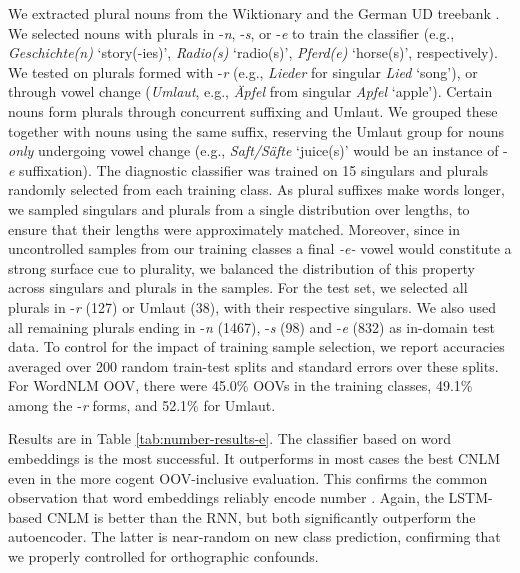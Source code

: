 We extracted plural nouns from the Wiktionary and the German UD
treebank \cite{mcdonald2013universal,brants2002tiger}.  We
selected %
nouns with plurals in -\emph{n}, -\emph{s}, or -\emph{e} to train the
classifier (e.g., \emph{Geschichte(n)} `story(-ies)', \emph{Radio(s)}
`radio(s)', \emph{Pferd(e)} `horse(s)', respectively). We tested on
plurals formed with -\emph{r} (e.g., \emph{Lieder} for singular
\emph{Lied} `song'), or through vowel change (\emph{Umlaut}, e.g.,
\emph{{\"A}pfel} from singular \emph{Apfel} `apple'). Certain nouns
form plurals through concurrent suffixing and Umlaut. We grouped
these together with nouns using the same suffix, reserving the Umlaut
group for nouns \emph{only} undergoing vowel change (e.g.,
\emph{Saft/S\"afte} `juice(s)' would be an instance of -\emph{e}
suffixation). The diagnostic classifier was trained on 15 singulars and plurals
randomly selected from each training class.  As plural suffixes make
words longer, we sampled singulars and
plurals %
from a single distribution over lengths, to ensure that their lengths
were approximately matched. Moreover, since in uncontrolled samples
from our training classes a final \emph{-e-} vowel would constitute a
strong surface cue to plurality, we balanced the distribution of this
property across singulars and plurals in the samples. For the test
set, we selected all plurals in -\emph{r} (127) or Umlaut (38), with
their respective singulars. %
We also used all remaining plurals ending in -\emph{n} (1467),
-\emph{s} (98) and -\emph{e} (832) as in-domain test data.
To control for the impact of training sample selection, we report
accuracies averaged over 200 random train-test splits and
standard errors over these splits. %
For WordNLM OOV, there were 45.0\% OOVs in the training classes,
49.1\% among the -\emph{r} forms, and 52.1\% for Umlaut.

Results are in Table \ref{tab:number-results-e}. The classifier based
on word embeddings is the most successful. It outperforms in most cases
the best CNLM even in the more cogent OOV-inclusive evaluation. This
confirms the common observation that word embeddings reliably encode
number \cite{Mikolov:etal:2013a}. Again, the LSTM-based CNLM is better
than the RNN, but both significantly outperform the autoencoder. The
latter is near-random on new class prediction, confirming that we
properly controlled for orthographic confounds.

